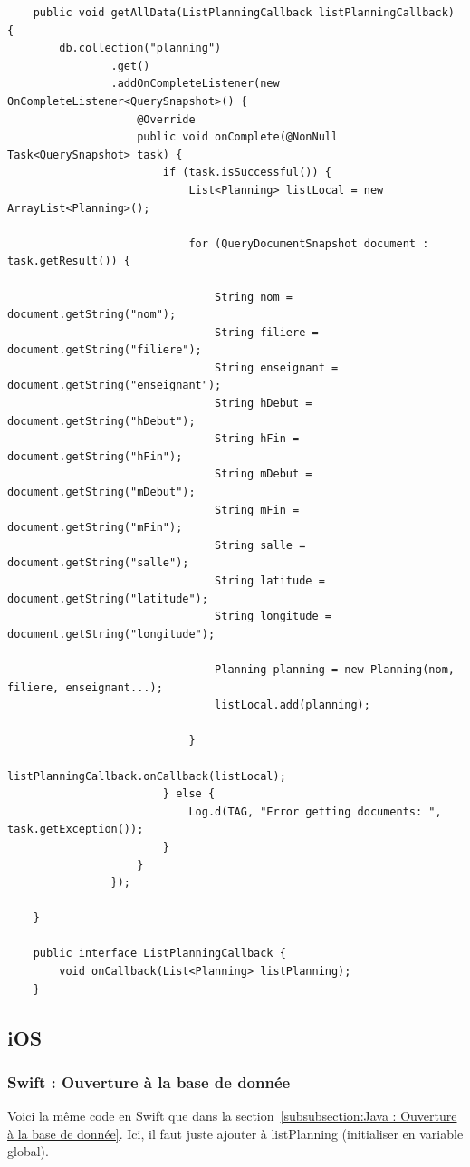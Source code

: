 \documentclass{article}
\begin{document}
\begin{verbatim}
    public void getAllData(ListPlanningCallback listPlanningCallback) {
        db.collection("planning")
                .get()
                .addOnCompleteListener(new OnCompleteListener<QuerySnapshot>() {
                    @Override
                    public void onComplete(@NonNull Task<QuerySnapshot> task) {
                        if (task.isSuccessful()) {
                            List<Planning> listLocal = new ArrayList<Planning>();

                            for (QueryDocumentSnapshot document : task.getResult()) {

                                String nom = document.getString("nom");
                                String filiere = document.getString("filiere");
                                String enseignant = document.getString("enseignant");
                                String hDebut = document.getString("hDebut");
                                String hFin = document.getString("hFin");
                                String mDebut = document.getString("mDebut");
                                String mFin = document.getString("mFin");
                                String salle = document.getString("salle");
                                String latitude = document.getString("latitude");
                                String longitude = document.getString("longitude");

                                Planning planning = new Planning(nom, filiere, enseignant...);
                                listLocal.add(planning);

                            }
                            listPlanningCallback.onCallback(listLocal);
                        } else {
                            Log.d(TAG, "Error getting documents: ", task.getException());
                        }
                    }
                });

    }

    public interface ListPlanningCallback {
        void onCallback(List<Planning> listPlanning);
    }
\end{verbatim}




\subsection{iOS} %
\label{subsection:iOS} 


\subsubsection{Swift : Ouverture à la base de donnée}
\label{subsubsection:Swift : Ouverture à la base de donnée} 
Voici la même code en Swift que dans la section~\ref{subsubsection:Java : Ouverture à la base de donnée}.
Ici, il faut juste ajouter à listPlanning (initialiser en variable global).
\end{document}

